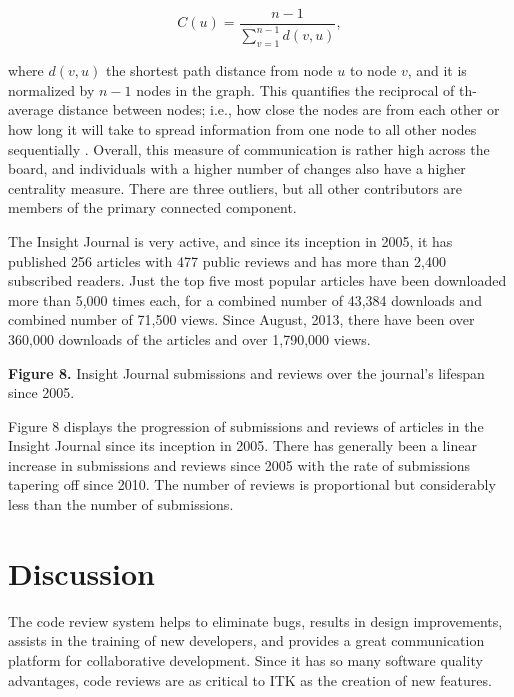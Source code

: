 \documentclass{frontiersENG} %
\begin{document}
\begin{equation}
   C(u) = \frac{n - 1}{\sum_{v=1}^{n-1} d(v, u)},
\end{equation}

where $d(v, u)$ the shortest path distance from node $u$ to node $v$, and it
is normalized by $n-1$ nodes in the graph. This quantifies the reciprocal of th-
average distance between nodes; i.e., how close the nodes are from each other
or how long it will take to spread information from one node to all other
nodes sequentially \cite{Newman2005}. Overall, this measure of communication is
rather high across the board, and individuals with a higher
number of changes also have a higher centrality measure.  There are three
outliers, but all other contributors are members of the primary connected
component.


%
%
%
The Insight Journal is very active, and since its inception in 2005, it has published
256 articles with 477 public reviews and has more than 2,400 subscribed
readers. Just the top five most popular articles have been downloaded more than
5,000 times each, for a combined number of 43,384 downloads and combined number
of 71,500 views. Since August, 2013, there have been over 360,000 downloads of
the articles and over 1,790,000 views.

\textbf{Figure 8. }{Insight Journal submissions and reviews over the journal's
lifespan since 2005.} \label{fig:08}

Figure 8 displays the progression of submissions and reviews of articles in the
Insight Journal since its inception in 2005.  There has generally been a linear
increase in submissions and reviews since 2005 with the rate of submissions
tapering off since 2010.  The number of reviews is proportional but
considerably less than the number of submissions.



\section{Discussion}
The code review system helps to eliminate bugs, results in design improvements,
assists in the training of new developers, and provides a great communication
platform for collaborative development. Since it has so many software quality
advantages, code reviews are as critical to ITK as the creation of new features.
\end{document}
